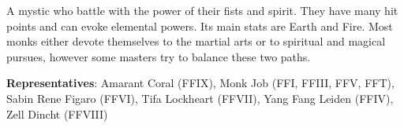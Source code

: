 \begin{jobdesc}[name=pjob-monk]
    A mystic who battle with the power of their fists and spirit. They have many hit points and can evoke elemental powers. Its main stats are Earth and Fire. Most monks either devote themselves to the martial arts or to spiritual and magical pursues, however some masters try to balance these two paths. \pc%

    \textbf{Representatives}: Amarant Coral (FFIX), Monk Job (FFI, FFIII, FFV, FFT), Sabin Rene Figaro (FFVI), Tifa Lockheart (FFVII), Yang Fang Leiden (FFIV), Zell Dincht (FFVIII) \pc%

    \jobstats[hpa=6x,hpb=7x,hpc=8x,hpd=9x,mpa=0x,mpc=1x,armor=Medium,
    weapons=Claws/Gloves \\ Wands \\ Throwing Weapons]
\end{jobdesc}

